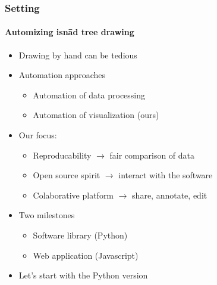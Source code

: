 \documentclass[9pt]{beamer}
\begin{document}
\begin{frame}
\frametitle{Setting}
\framesubtitle{Automizing isnād tree drawing}
\begin{itemize}%
	\item Drawing by hand can be tedious
	\pause
	\item Automation approaches
	\begin{itemize}
		\item Automation of data processing
		\item Automation of visualization (ours)
	\end{itemize}
	\pause
	\item Our focus:
	\begin{itemize}
		\item Reproducability $\rightarrow$ fair comparison of data
		\item Open source spirit $\rightarrow$ interact with the software
		\item Colaborative platform $\rightarrow$ share, annotate, edit
	\end{itemize}
	\pause
	\item Two milestones
	\begin{itemize}
		\item Software library (Python)
		\item Web application (Javascript)
	\end{itemize}
	\pause
	\item Let's start with the Python version
\end{itemize}
\end{frame} 
\end{document}
